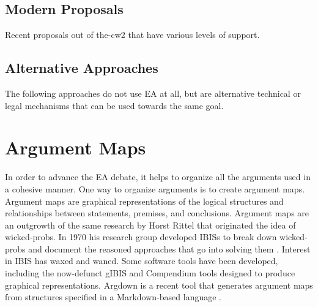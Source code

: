 \subsection{Modern Proposals}

Recent proposals out of \ac{the-cw2} that have various levels of support.

\propsstart
\propsend


\subsection{Alternative Approaches}

The following approaches do not use \ac{EA} at all, but are alternative technical or legal mechanisms that can be used
towards the same goal.

\propsstart
\propsend

\section{Argument Maps}
\label{sec-arg-maps-intro}

In order to advance the \ac{EA} debate, it helps to organize all the arguments used in a cohesive manner. One way to
organize arguments is to create argument maps. Argument maps are graphical representations of the logical structures and
relationships between statements, premises, and conclusions. Argument maps are an outgrowth of the same research by
Horst Rittel that originated the idea of \acp{wicked-prob}. In 1970 his research group developed \acp{IBIS} to break
down \acp{wicked-prob} and document the reasoned approaches that go into solving them \cite{kunz_issues_1970}. Interest
in \ac{IBIS} has waxed and waned. Some software tools have been developed, including the now-defunct gIBIS
\cite{conklin_gibis_1988} and Compendium \cite{dutoit_hypermedia_2006} tools designed to produce graphical
representations. Argdown is a recent tool that generates argument maps from structures specified in a Markdown-based
language \cite{voigt_argdown_2018}.

